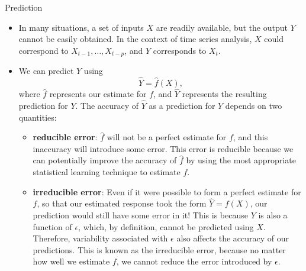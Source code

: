 \documentclass[10pt,a4paper]{beamer}
\begin{document}
\begin{frame}{Prediction}



\begin{itemize}\footnotesize
  \item In many situations, a set of inputs $X$ are readily available, but the output
$Y$ cannot be easily obtained. In the context of time series analysis, $X$ could correspond to $X_{t-1},\dots,X_{t-p}$, and $Y$ corresponds to $X_{t}$.
\item We can predict $Y$ using
\begin{equation}\label{}
  \hat{Y} = \hat{f}(X),
\end{equation}
where $\hat{f}$ represents our estimate for $f$, and $\hat{Y}$ represents the resulting prediction for $Y$.  The accuracy of $\hat{Y}$ as a prediction for $Y$ depends on two quantities:
  \begin{itemize}
    \item \textbf{reducible error}: $\hat{f}$ will not be a perfect estimate for $f$, and this inaccuracy will introduce
some error. This error is reducible because we can potentially improve the
accuracy of $\hat{f}$ by using the most appropriate statistical learning technique to
estimate $f$.
    \item \textbf{irreducible error}: Even if it were possible to form a perfect estimate for
$f$, so that our estimated response took the form $\hat{Y}=f(X)$, our prediction
would still have some error in it! This is because $Y$ is also a function of
$\epsilon$, which, by definition, cannot be predicted using $X$. Therefore, variability
associated with $\epsilon$ also affects the accuracy of our predictions. This is known
as the irreducible error, because no matter how well we estimate $f$, we
cannot reduce the error introduced by $\epsilon$.
  \end{itemize}
\end{itemize}
\end{frame}
\end{document}
